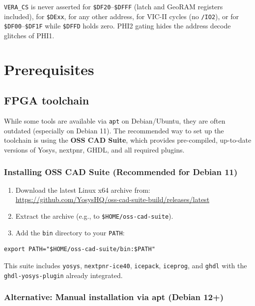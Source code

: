 \documentclass[11pt,a4paper]{article}
\newcommand{\cmd}[1]{\texttt{#1}}
\newcommand{\sig}[1]{\texttt{#1}}
\newcommand{\file}[1]{\texttt{#1}}
\newcommand{\hex}[1]{\texttt{\$#1}}
\begin{document}
\sig{VERA\_CS} is never asserted for \hex{DF20}--\hex{DFFF} (latch and
GeoRAM registers included), for \hex{DExx}, for any other address, for
VIC-II cycles (no \sig{/IO2}), or for \hex{DF00}--\hex{DF1F} while
\hex{DFFD} holds zero.  PHI2 gating hides the address decode glitches of
PHI1.

\section{Prerequisites}

\subsection{FPGA toolchain}

While some tools are available via \cmd{apt} on Debian/Ubuntu, they are often outdated (especially on Debian 11). The recommended way to set up the toolchain is using the \textbf{OSS CAD Suite}, which provides pre-compiled, up-to-date versions of Yosys, nextpnr, GHDL, and all required plugins.

\subsubsection{Installing OSS CAD Suite (Recommended for Debian 11)}

\begin{enumerate}
    \item Download the latest Linux x64 archive from: \\
          \url{https://github.com/YosysHQ/oss-cad-suite-build/releases/latest}
    \item Extract the archive (e.g., to \file{\$HOME/oss-cad-suite}).
    \item Add the \file{bin} directory to your \cmd{PATH}:
\end{enumerate}

\begin{lstlisting}[style=shell]
export PATH="$HOME/oss-cad-suite/bin:$PATH"
\end{lstlisting}

This suite includes \cmd{yosys}, \cmd{nextpnr-ice40}, \cmd{icepack}, \cmd{iceprog}, and \cmd{ghdl} with the \cmd{ghdl-yosys-plugin} already integrated.

\subsubsection{Alternative: Manual installation via apt (Debian 12+)}
\end{document}
